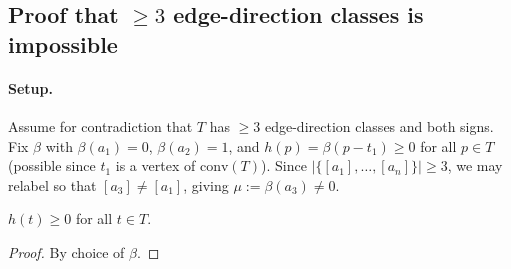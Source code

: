 %
%
%
%

\subsection*{Proof that $\geq 3$ edge-direction classes is impossible}

\paragraph{Setup.}
Assume for contradiction that $T$ has $\geq 3$ edge-direction classes and both signs.
Fix $\beta$ with $\beta(a_1)=0$, $\beta(a_2)=1$, and $h(p) = \beta(p-t_1) \geq 0$ for all
$p \in T$ (possible since $t_1$ is a vertex of $\mathrm{conv}(T)$).
Since $|\{[a_1],\ldots,[a_n]\}| \geq 3$, we may relabel so that $[a_3] \neq [a_1]$,
giving $\mu := \beta(a_3) \neq 0$.

\begin{lemma}[betamin]\label{lem:betamin}
$h(t) \geq 0$ for all $t \in T$.
\end{lemma}
\begin{proof}
By choice of $\beta$.
\end{proof}

